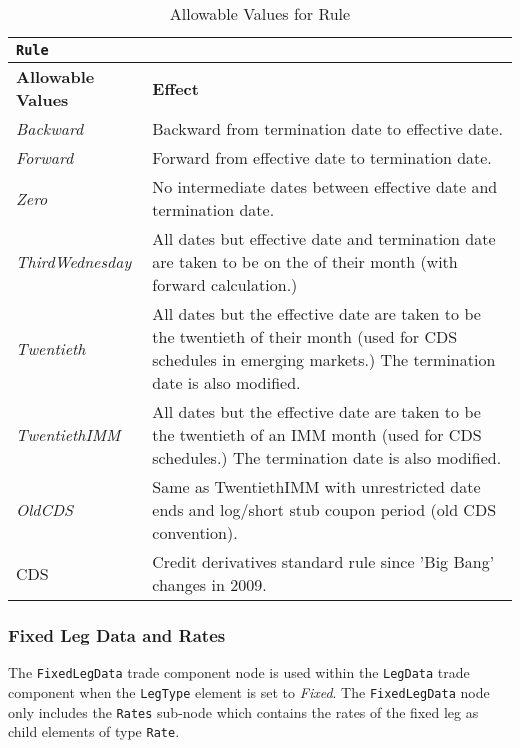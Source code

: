 \begin{table}[H]
\centering
\begin{tabular}{|l|p{6cm}|}
\hline
\multicolumn{2}{|l|}{\lstinline!Rule!}                    \\ \hline
\textbf{Allowable Values}                   & \textbf{Effect}                       \\ \hline
\emph{Backward}   &   Backward from termination date to effective date.   \\ \hline
\emph{Forward}   &   Forward from effective date to termination date.  \\ \hline
\emph{Zero}   &   No intermediate dates between effective date and termination date.  \\ \hline
\emph{ThirdWednesday}   &   All dates but effective date and termination date are taken to be on the  of their month (with forward calculation.) \\ \hline
\emph{Twentieth}   &   All dates but the effective date are taken to be the twentieth of their month (used for CDS schedules in emerging markets.)  The termination date is also modified. \\ \hline
\emph{TwentiethIMM}   &   All dates but the effective date are  taken to be the twentieth of an IMM month (used for CDS schedules.)  The termination date is also modified. \\ \hline
\emph{OldCDS}   &   Same as TwentiethIMM with unrestricted date ends and log/short stub coupon period (old CDS convention).\\ \hline
CDS   &   Credit derivatives standard rule since 'Big Bang' changes in 2009.\\ \hline
\end{tabular}
  \caption{Allowable Values for Rule}
  \label{tab:rule}
\end{table}



\subsubsection{Fixed Leg Data and Rates}
\label{ss:fixedleg_data}

The \lstinline!FixedLegData! trade component node is used within the \lstinline!LegData! trade component when the \lstinline!LegType! element is set to \emph{Fixed}. The \lstinline!FixedLegData! node only includes the \lstinline!Rates! sub-node which contains the rates of the fixed leg as child elements of type \lstinline!Rate!.

